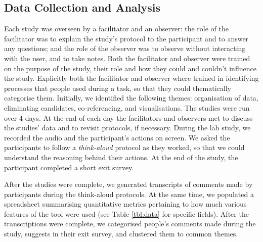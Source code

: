\documentclass{sigchi}
\begin{document}
\subsection{Data Collection and Analysis}
Each study was overseen by a facilitator and an observer:  the role of the facilitator was to explain the study's protocol to the participant and to answer any questions; and the role of the observer was to observe without interacting with the user, and to take notes.  Both the facilitator and observer were trained on the purpose of the study, their role and how they could and couldn't influence the study.   Explicitly both the facilitator and observer where trained in identifying processes that people used during a task, so that they could thematically categorise them.  Initially, we identified the following themes: organisation of data, eliminating candidates, co-referencing, and visualisations. The studies were run over 4 days.  At the end of each day the facilitators and observers met to discuss the studies' data and to revisit protocols, if necessary.  During the lab study, we recorded the audio and the participant's actions on screen. We asked the participants to follow a \emph{think-aloud} protocol as they worked, so that we could understand the reasoning behind their actions.  At the end of the study, the participant completed a short exit survey.

After the studies were complete, we generated transcripts of comments made by participants during the think-aloud protocols. At the same time, we populated a spreadsheet summarising quantitative metrics pertaining to how much various features of the tool were used (see Table \ref{tbl:data} for specific fields).  After the transcriptions were complete, we categorised people's comments made during the study, suggests in their exit survey, and clustered them to common themes.

\end{document}
